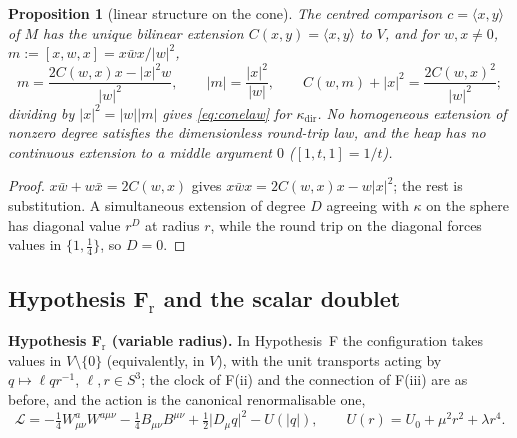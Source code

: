 \documentclass[aps,pra,onecolumn,superscriptaddress,nofootinbib,10pt]{revtex4-2}
\newtheorem{proposition}[theorem]{Proposition}
\theoremstyle{definition}
\theoremstyle{remark}
\newcommand{\ip}[2]{\langle #1,#2\rangle}
\newcommand{\hp}[3]{[#1,#2,#3]}
\begin{document}
\begin{proposition}[linear structure on the cone]\label{prop:conelinear}
The centred comparison $c=\ip xy$ of $M$ has the unique bilinear extension $C(x,y)=\ip xy$ to $V$, and for
$w,x\ne0$, $m:=\hp xwx=x\bar wx/\lvert w\rvert^2$,
\[
m=\frac{2C(w,x)x-\lvert x\rvert^2w}{\lvert w\rvert^2},\qquad \lvert m\rvert=\frac{\lvert x\rvert^2}{\lvert w\rvert},\qquad
C(w,m)+\lvert x\rvert^2=\frac{2C(w,x)^2}{\lvert w\rvert^2};
\]
dividing by $\lvert x\rvert^2=\lvert w\rvert\lvert m\rvert$ gives \eqref{eq:conelaw} for $\kappa_{\mathrm{dir}}$.  No homogeneous extension of
nonzero degree satisfies the dimensionless round-trip law, and the heap has no continuous extension
to a middle argument $0$ ($\hp1t1=1/t$).
\end{proposition}
\begin{proof}
$x\bar w+w\bar x=2C(w,x)$ gives $x\bar wx=2C(w,x)x-w\lvert x\rvert^2$; the rest is substitution.  A simultaneous
extension of degree $D$ agreeing with $\kappa$ on the sphere has diagonal value $r^D$ at radius $r$, while the
round trip on the diagonal forces values in $\{1,\tfrac14\}$, so $D=0$.
\end{proof}

\subsection{Hypothesis F$_{\mathrm r}$ and the scalar doublet}
\smallskip\noindent\textbf{Hypothesis F$_{\mathrm r}$ (variable radius).}  In Hypothesis~F the configuration takes values
in $V\setminus\{0\}$ (equivalently, in $V$), with the unit transports acting by $q\mapsto\ell qr^{-1}$, $\ell,r\in S^3$; the clock
of F(ii) and the connection of F(iii) are as before, and the action is the canonical renormalisable one,
\begin{equation}\label{eq:radialaction}
\mathcal L=-\tfrac14W^a_{\mu\nu}W^{a\mu\nu}-\tfrac14B_{\mu\nu}B^{\mu\nu}+\tfrac12\lvert D_\mu q\rvert^2-U(\lvert q\rvert),\qquad
U(r)=U_0+\mu^2r^2+\lambda r^4 .
\end{equation}
\end{document}

